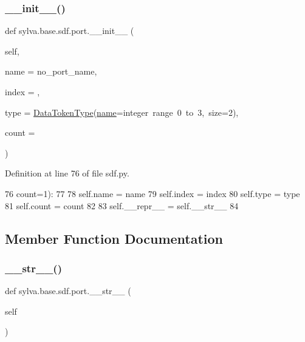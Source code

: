 \subsubsection{\texorpdfstring{\+\_\+\+\_\+init\+\_\+\+\_\+()}{\_\_init\_\_()}}
{\footnotesize\ttfamily def sylva.\+base.\+sdf.\+port.\+\_\+\+\_\+init\+\_\+\+\_\+ (\begin{DoxyParamCaption}\item[{}]{self,  }\item[{}]{name = {\ttfamily \textquotesingle{}no\+\_\+port\+\_\+name\textquotesingle{}},  }\item[{}]{index = {},  }\item[{}]{type = {\ttfamily \hyperlink{classsylva_1_1base_1_1sdf_1_1_data_token_type}{Data\+Token\+Type}(\hyperlink{classsylva_1_1base_1_1sdf_1_1port_ace0eb23bb9f3e4a75e6a94f0961a6f99}{name}=\textquotesingle{}integer~range~0~to~3\textquotesingle{},~size=2)},  }\item[{}]{count = {} }\end{DoxyParamCaption})}



Definition at line 76 of file sdf.\+py.


\begin{DoxyCode}
76                      count=1):
77 
78             self.name = name
79             self.index = index
80             self.type = type
81             self.count = count
82 
83             self.\_\_repr\_\_ = self.\_\_str\_\_
84 
\end{DoxyCode}


\subsection{Member Function Documentation}
\mbox{\label{classsylva_1_1base_1_1sdf_1_1port_a81a42bad6d299ec55b3d1482439d452f}} 
\subsubsection{\texorpdfstring{\+\_\+\+\_\+str\+\_\+\+\_\+()}{\_\_str\_\_()}}
{\footnotesize\ttfamily def sylva.\+base.\+sdf.\+port.\+\_\+\+\_\+str\+\_\+\+\_\+ (\begin{DoxyParamCaption}\item[{}]{self }\end{DoxyParamCaption})}



